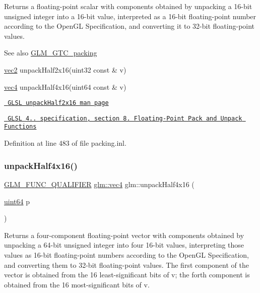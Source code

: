 Returns a floating-\/point scalar with components obtained by unpacking a 16-\/bit unsigned integer into a 16-\/bit value, interpreted as a 16-\/bit floating-\/point number according to the Open\+GL Specification, and converting it to 32-\/bit floating-\/point values.

\begin{DoxySeeAlso}{See also}
\mbox{\hyperlink{group__gtc__packing}{G\+L\+M\+\_\+\+G\+T\+C\+\_\+packing}} 

\mbox{\hyperlink{group__core__types_gaa1618f51db67eaa145db101d8c8431d8}{vec2}} unpack\+Half2x16(uint32 const \& v) 

\mbox{\hyperlink{group__core__types_ga5881b1b022d7fd1b7218f5916532dd02}{vec4}} unpack\+Half4x16(uint64 const \& v) 

\href{http://www.opengl.org/sdk/docs/manglsl/xhtml/unpackHalf2x16.xml}{\texttt{ G\+L\+SL unpack\+Half2x16 man page}} 

\href{http://www.opengl.org/registry/doc/GLSLangSpec.4.20.8.pdf}{\texttt{ G\+L\+SL 4.. specification, section 8. Floating-\/\+Point Pack and Unpack Functions}} 
\end{DoxySeeAlso}


Definition at line 483 of file packing.\+inl.

\mbox{\label{group__gtc__packing_gaea526d6491ad40401eac34803984bf27}} 
\subsubsection{\texorpdfstring{unpackHalf4x16()}{unpackHalf4x16()}}
{\footnotesize\ttfamily \mbox{\hyperlink{setup_8hpp_a33fdea6f91c5f834105f7415e2a64407}{G\+L\+M\+\_\+\+F\+U\+N\+C\+\_\+\+Q\+U\+A\+L\+I\+F\+I\+ER}} \mbox{\hyperlink{group__core__types_ga5881b1b022d7fd1b7218f5916532dd02}{glm\+::vec4}} glm\+::unpack\+Half4x16 (\begin{DoxyParamCaption}\item[{\mbox{\hyperlink{group__gtc__type__precision_gae3632bf9b37da66233d78930dd06378a}{uint64}}}]{p }\end{DoxyParamCaption})}

Returns a four-\/component floating-\/point vector with components obtained by unpacking a 64-\/bit unsigned integer into four 16-\/bit values, interpreting those values as 16-\/bit floating-\/point numbers according to the Open\+GL Specification, and converting them to 32-\/bit floating-\/point values. The first component of the vector is obtained from the 16 least-\/significant bits of v; the forth component is obtained from the 16 most-\/significant bits of v.

